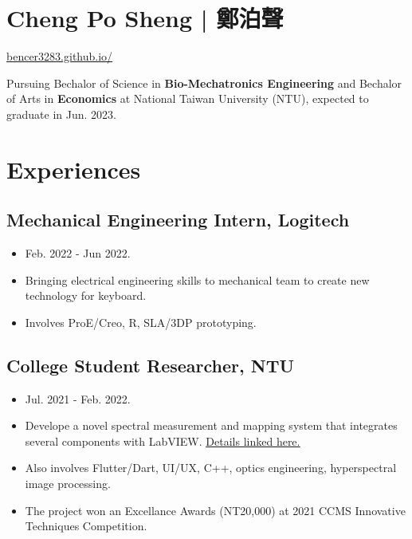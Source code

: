 \documentclass[12pt]{article}
\begin{document}
    \section*{Cheng Po Sheng | 鄭泊聲}
    {
    \sffamily \href{https://bencer3283.github.io}{\underline{bencer3283.github.io/}} 
    \par \noindent Pursuing Bechalor of Science in \textbf{Bio-Mechatronics Engineering} and Bechalor of Arts in \textbf{Economics} at 
    National Taiwan University (NTU), expected to graduate in Jun. 2023.
    }
    \section*{Experiences
    }
        \subsection*{Mechanical Engineering Intern, Logitech}
        {\sffamily
        \begin{itemize}
            \item Feb. 2022 - Jun 2022.
            \item Bringing electrical engineering skills to mechanical team to create new technology for keyboard. 
            \item Involves ProE/Creo, R, SLA/3DP prototyping.
        \end{itemize}
        }
        \subsection*{College Student Researcher, NTU}
        {\sffamily
        \begin{itemize}
            \item Jul. 2021 - Feb. 2022.
            \item Develope a novel spectral measurement and mapping system that integrates several components with LabVIEW. \href{https://bencer3283.github.io/experiences/collegeStudentResearch/}{\underline{Details linked here.}}
            \item Also involves Flutter/Dart, UI/UX, C++, optics engineering, hyperspectral image processing.
            \item The project won an Excellance Awards (NT20,000) at 2021 CCMS Innovative Techniques Competition.
        \end{itemize}}
\end{document}
